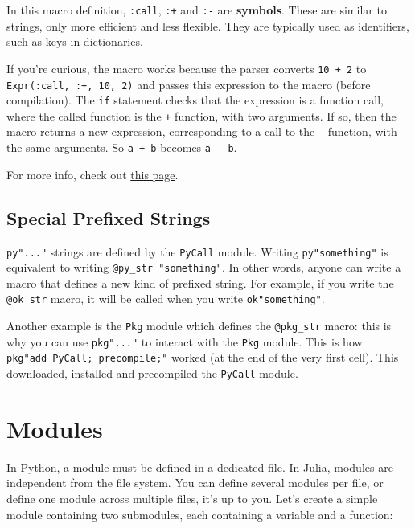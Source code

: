 \documentclass[11pt]{article}
\begin{document}
    In this macro definition, \texttt{:call}, \texttt{:+} and \texttt{:-}
are \textbf{symbols}. These are similar to strings, only more efficient
and less flexible. They are typically used as identifiers, such as keys
in dictionaries.

    If you're curious, the macro works because the parser converts
\texttt{10\ +\ 2} to \texttt{Expr(:call,\ :+,\ 10,\ 2)} and passes this
expression to the macro (before compilation). The \texttt{if} statement
checks that the expression is a function call, where the called function
is the \texttt{+} function, with two arguments. If so, then the macro
returns a new expression, corresponding to a call to the \texttt{-}
function, with the same arguments. So \texttt{a\ +\ b} becomes
\texttt{a\ -\ b}.

    For more info, check out
\href{https://docs.julialang.org/en/v1/manual/metaprogramming/}{this
page}.

    \hypertarget{special-prefixed-strings}{%
\subsection{Special Prefixed Strings}\label{special-prefixed-strings}}

    \texttt{py"..."} strings are defined by the \texttt{PyCall} module.
Writing \texttt{py"something"} is equivalent to writing
\texttt{@py\_str\ "something"}. In other words, anyone can write a macro
that defines a new kind of prefixed string. For example, if you write
the \texttt{@ok\_str} macro, it will be called when you write
\texttt{ok"something"}.

Another example is the \texttt{Pkg} module which defines the
\texttt{@pkg\_str} macro: this is why you can use \texttt{pkg"..."} to
interact with the \texttt{Pkg} module. This is how
\texttt{pkg"add\ PyCall;\ precompile;"} worked (at the end of the very
first cell). This downloaded, installed and precompiled the
\texttt{PyCall} module.

    \hypertarget{modules}{%
\section{Modules}\label{modules}}

In Python, a module must be defined in a dedicated file. In Julia,
modules are independent from the file system. You can define several
modules per file, or define one module across multiple files, it's up to
you. Let's create a simple module containing two submodules, each
containing a variable and a function:
\end{document}
